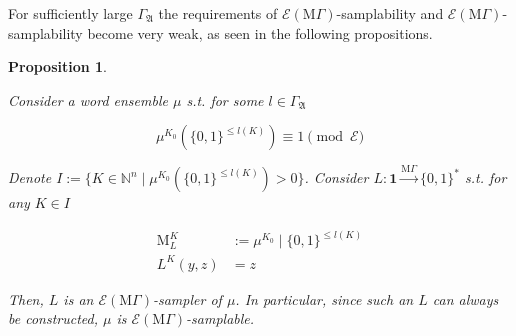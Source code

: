 \documentclass{article}
\numberwithin{equation}{section}
\theoremstyle{definition}
\theoremstyle{plain}
\newtheorem{proposition}{Proposition}[section]
\newcommand{\Bool}{\{0,1\}}
\newcommand{\Words}{{\Bool^*}}
\DeclareMathOperator{\M}{M}
\newcommand{\Nats}{\mathbb{N}}
\newcommand{\GrowA}{\Gamma_{\mathfrak{A}}}
\newcommand{\MGrow}{\mathrm{M}\Gamma}
\newcommand{\Fall}{\mathcal{E}}
\newcommand{\EMG}{\Fall(\MGrow)}
\newcommand{\MScheme}{\xrightarrow{\MGrow}}
\begin{document}
For sufficiently large $\GrowA$ the requirements of $\EMG$-samplability and $\EMG$-samplability become very weak, as seen in the following propositions.

\begin{samepage}
\begin{proposition}
\label{prp:adv_mgamma_smp}

Consider a word ensemble $\mu$ s.t. for some $l \in \GrowA$

\begin{equation}
\label{eqn:prp__adv_mgamma_smp}
\mu^{K_0}(\Bool^{\leq l(K)}) \equiv 1 \pmod \Fall
\end{equation}

Denote ${I:=\{K \in \Nats^n \mid \mu^{K_0}(\Bool^{\leq l(K)}) > 0\}}$. Consider ${L: \bm{1} \MScheme \Words}$ s.t. for any ${K \in I}$

\begin{align*}
\M_L^K&:=\mu^{K_0} \mid \Bool^{\leq l(K)} \\
L^K(y,z)&=z
\end{align*}

Then, $L$ is an $\EMG$-sampler of $\mu$. In particular, since such an $L$ can always be constructed, $\mu$ is $\EMG$-samplable.

\end{proposition}
\end{samepage}
\end{document}
